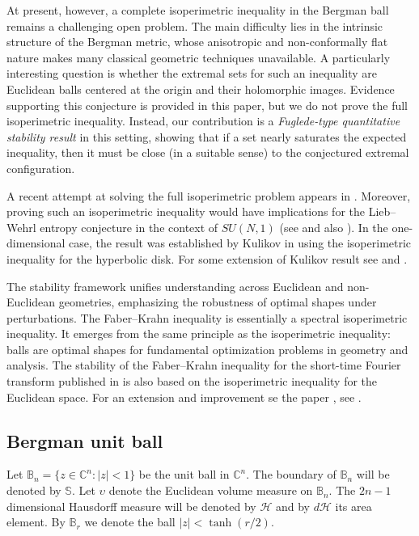 \documentclass[11pt]{amsart}
\numberwithin{equation}{section}
\begin{document}
At present, however, a complete isoperimetric inequality in the Bergman ball remains a challenging open problem. The main difficulty lies in the intrinsic structure of the Bergman metric, whose anisotropic and non-conformally flat nature makes many classical geometric techniques unavailable.
A particularly interesting question is whether the extremal sets for such an inequality are Euclidean balls centered at the origin and their holomorphic images.
Evidence supporting this conjecture is provided in this paper, but we do not prove the full isoperimetric inequality.
Instead, our contribution is a \emph{Fuglede-type quantitative stability result} in this setting, showing that if a set nearly saturates the expected inequality, then it must be close (in a suitable sense) to the conjectured extremal configuration.

A recent attempt at solving the full isoperimetric problem appears in \cite{suli}. Moreover, proving such an isoperimetric inequality would have implications for the Lieb--Wehrl entropy conjecture in the context of \(SU(N,1)\) (see \cite{prame} and also \cite{NicolaRiccardiTilliWehrl}). In the one-dimensional case, the result was established by Kulikov in \cite{kulik} using the isoperimetric inequality for the hyperbolic disk. For some extension of Kulikov result see \cite{kalaj-jfa} and \cite{kalaj-nyjm}.

The stability framework unifies understanding across Euclidean and non-Euclidean geometries, emphasizing the robustness of optimal shapes under perturbations. The Faber--Krahn inequality is essentially a spectral isoperimetric inequality. It emerges from the same principle as the isoperimetric inequality: balls are optimal shapes for fundamental optimization problems in geometry and analysis. The stability of the Faber--Krahn inequality for the short-time {Fourier} transform published in \cite{inventnew} is also based on the isoperimetric inequality for the Euclidean space. For an extension and improvement se the paper  \cite{inventnew}, see \cite{jkmr}.

\subsection{Bergman unit ball}
Let $\mathbb{B}_n=\{z\in\mathbb{C}^n: \vert z\vert<1\}$ be the unit ball in $\mathbb{C}^n$.
The boundary of $\mathbb{B}_n$ will be denoted by $\mathbb{S}$. Let $ \upsilon$ denote the Euclidean volume measure on $\mathbb{B}_n$.
The $2n-1$ dimensional Hausdorff measure will be denoted by $\mathcal{H}$ and by $d\mathcal{H}$ its area element.  By $\mathbb{B}_r$ we denote the ball $|z|<\tanh(r/2)$.
\end{document}
